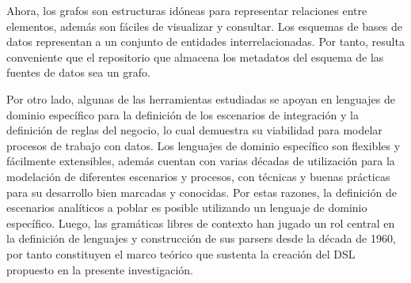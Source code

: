 Ahora, los grafos son estructuras idóneas para representar relaciones entre elementos, además son f\'aciles 
de visualizar y consultar. Los esquemas de bases de 
datos representan a un conjunto de entidades interrelacionadas. Por tanto, resulta conveniente que el repositorio 
que almacena los metadatos del esquema de las fuentes de datos sea un grafo.

Por otro lado, algunas de las herramientas estudiadas se apoyan en lenguajes de dominio específico para la definición 
de los escenarios de integración y la definición de reglas del negocio, lo cual demuestra su viabilidad para modelar 
procesos de trabajo con datos. Los lenguajes de dominio específico son flexibles y fácilmente extensibles, además 
cuentan con varias décadas de utilización para la modelación de diferentes escenarios y procesos, con técnicas y 
buenas prácticas para su desarrollo bien marcadas y conocidas. Por estas razones, la definición de escenarios 
analíticos a poblar es posible utilizando un lenguaje de dominio específico. Luego, las gramáticas libres de 
contexto han jugado un rol central en la definición de lenguajes y construcción de sus parsers desde la década 
de 1960\cite{hopcroft_introduction_2007}, por tanto constituyen el marco teórico que sustenta la creación 
del DSL propuesto en la presente investigación.